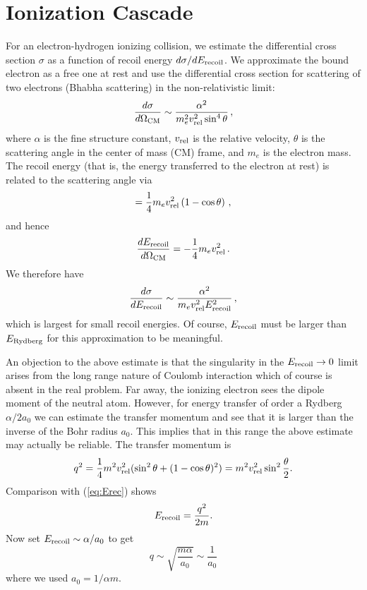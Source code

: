\documentclass[iop,numberedappendix,apj,twocolappendix,]{emulateapj}
\begin{document}
\section{Ionization Cascade}
\label{sec:AppendixA}

For an electron-hydrogen ionizing collision, we estimate the differential cross section $\sigma$ as a function of recoil energy $d\sigma / dE_{\rm recoil}$.
We approximate the bound electron as a free one at rest and use the differential cross section for scattering of two electrons (Bhabha scattering) in the non-relativistic limit:
\begin{equation}
\label{eq:dsig/dOmeg} \frac{d\sigma}{d\Omega_{\rm CM}} \sim \frac{\alpha^2}{m_e^2 v_{\rm rel}^2 \sin^4 \theta} \, ,
\end{equation}
where $\alpha$ is the fine structure constant, $v_{\rm rel}$ is the relative velocity, $\theta$ is the scattering angle in the center of mass (CM) frame, and $m_e$ is the electron mass.
The recoil energy (that is, the energy transferred to the electron at rest) is related to the scattering angle via
\begin{equation}
  \label{eq:Erec} = \frac{1}{4} m_e v_{\rm rel}^2 \left( 1 - \cos \theta \right) \, ,
\end{equation}
and hence
\begin{equation}
  \label{eq:dErec/dOmeg} \frac{dE_{\rm recoil}}{d\Omega_{\rm CM}} = -\frac{1}{4} m_e v_{\rm rel}^2 \, .
\end{equation}
We therefore have
\begin{equation}
  \label{eq:dsig/dErec} \frac{d\sigma}{dE_{\rm recoil}} \sim \frac{\alpha^2}{m_e v_{\rm rel}^2 E_{\rm recoil}^2} \, ,
\end{equation}
which is largest for small recoil energies.
Of course, $E_{\rm recoil}$ must be larger than $E_{\rm Rydberg}$ for this approximation to be meaningful. 

An objection to the above estimate is that the singularity in the $E_{\rm recoil} \rightarrow 0$ limit arises from the long range nature of Coulomb interaction which of course is absent in the real problem.
Far away, the ionizing electron sees the dipole moment of the neutral atom.
However, for energy transfer of order a Rydberg $\alpha/2a_0$ we can estimate the transfer momentum and see that it is larger than the inverse of the Bohr radius $a_0$.
This implies that in this range the above estimate may actually be reliable. The transfer momentum is
\begin{equation}
q^2 =\frac{1}{4} m^2 v_{\rm rel}^2 (\sin^2\theta +(1-\cos \theta)^2)= m^2v_{\rm rel}^2 \sin^2 \frac{\theta}{2}.
\end{equation}
Comparison with (\ref{eq:Erec}) shows
\begin{equation}
E_{\rm recoil} = \frac{q^2}{2m}.
\end{equation}
Now set $E_{\rm recoil} \sim \alpha/a_0$ to get
\begin{equation}
q \sim \sqrt{\frac{m\alpha}{a_0}}\sim \frac{1}{a_0}
\end{equation}
where we used $a_0 = 1/\alpha m$.
\end{document}
